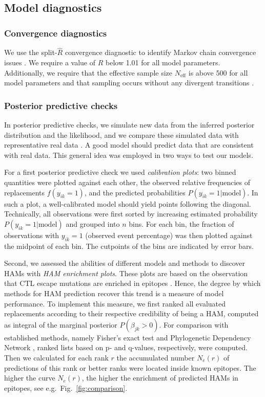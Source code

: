\documentclass{bioinfo}
\begin{document}
\begin{methods}
\subsection{Model diagnostics}

\subsubsection{Convergence diagnostics}
We use the split-\(\hat{R}\) convergence diagnostic to identify Markov chain convergence issues \citep{Gelman1992, Stan2021}. We require a value of \(\hat{R}\) below 1.01 for all model parameters. Additionally, we require that the effective sample size \(N_{\text{eff}}\) is above 500 for all model parameters and that sampling occurs without any divergent transitions \citep{Stan2021}.

\subsubsection{Posterior predictive checks}

In posterior predictive checks, we simulate new data from the inferred posterior distribution and the likelihood, and we compare these simulated data with representative real data \citep{Gabry2019}. A good model should predict data that are consistent with real data. This general idea was employed in two ways to test our models.

For a first posterior predictive check we used \emph{calibration plots}: two binned quantities were plotted against each other, the observed relative frequencies of replacements $f(y_{ik}=1)$, and the predicted probabilities $P(y_{ik}=1|\text{model})$. In such a plot, a well-calibrated model should yield points following the diagonal. Technically, all observations were first sorted by increasing estimated probability $P(y_{ik}=1|\text{model})$ and grouped into $n$ bins. For each bin, the fraction of observations with $y_{ik}=1$ (observed event percentage) was then plotted against the midpoint of each bin. The cutpoints of the bins are indicated by error bars.

Second, we assessed the abilities of different models and methods to discover HAMs with \emph{HAM enrichment plots}. These plots are based on the observation that CTL escape mutations are enriched in epitopes \citep{Bronke2013}. Hence, the degree by which methods for HAM prediction recover this trend is a measure of model performance. To implement this measure, we first ranked all evaluated replacements according to their respective credibility of being a HAM, computed as integral of the marginal posterior $P(\beta_{jk}>0)$. For comparison with established methods, namely Fisher's exact test and Phylogenetic Dependency Network \citep{Carlson2008}, ranked lists based on p- and q-values, respectively, were computed. Then we calculated for each rank $r$ the accumulated number $N_e(r)$ of predictions of this rank or better ranks were located inside known epitopes. The higher the curve $N_e(r)$, the higher the enrichment of predicted HAMs in epitopes, see e.g.\ Fig.\ \ref{fig:comparison}.


\end{methods}
\end{document}
